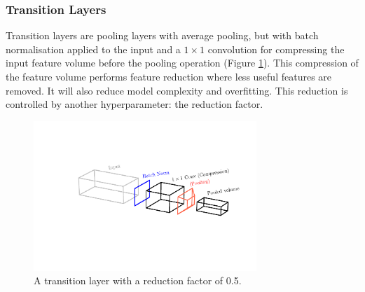 \subsubsection{Transition Layers}
Transition layers are pooling layers with average pooling, but with batch normalisation applied to the input and a $1\times{}1$ convolution for compressing the input feature volume before the pooling operation (Figure \ref{fig:machine_learning:transition_layer}). 
This compression of the feature volume performs feature reduction where less useful features are removed. It will also reduce model complexity and overfitting. This reduction is controlled by another hyperparameter: the reduction factor. 
\begin{figure}[h!]
    \includegraphics[width=0.75\textwidth]{figures/machine_learning/transition_layer.pdf}
    \caption{A transition layer with a reduction factor of 0.5.}
        \label{fig:machine_learning:transition_layer}
\end{figure}


